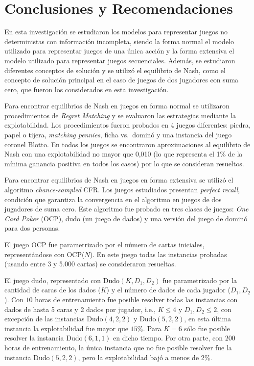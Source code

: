 \chapter*{Conclusiones y Recomendaciones}

En esta investigación se estudiaron los modelos para representar juegos no deterministas con información incompleta, siendo la forma normal el modelo utilizado para representar juegos de una única acción y la forma extensiva el modelo utilizado para representar juegos secuenciales. Además, se estudiaron diferentes conceptos de solución y se utilizó el equilibrio de Nash, como el concepto de solución principal en el caso de juegos de dos jugadores con suma cero, que fueron los considerados en esta investigación.

Para encontrar equilibrios de Nash en juegos en forma normal se utilizaron procedimientos de \textit{Regret Matching} y se evaluaron las estrategias mediante la explotabilidad. Los procedimientos fueron probados en 4 juegos diferentes: piedra, papel o tijera, \textit{matching pennies}, ficha vs.\ dominó y una instancia del juego coronel Blotto. En todos los juegos se encontraron aproximaciones al equilibrio de Nash con una explotabilidad no mayor que 0,010 (lo que representa el  1\% de la mínima ganancia positiva en todos los casos) por lo que se consideran resueltos.

Para encontrar equilibrios de Nash en juegos en forma extensiva se utilizó el algoritmo \textit{chance-sampled} CFR. Los juegos estudiados presentan \textit{perfect recall}, condición que garantiza la convergencia en el algoritmo en juegos de dos jugadores de suma cero. Este algoritmo fue probado en tres clases de juegos: \textit{One Card Poker} (OCP), dudo (un juego de dados) y una versión del juego de dominó para dos personas.

El juego OCP fue parametrizado por el número de cartas iniciales, representándose con OCP($N$). En este juego todas las instancias probadas (usando entre 3 y 5.000 cartas) se consideraron resueltas.

El juego dudo, representado con Dudo$(K, D_1, D_2)$ fue parametrizado por la cantidad de caras de los dados ($K$) y el número de dados de cada jugador ($D_1, D_2$). Con $10$ horas de entrenamiento fue posible resolver todas las instancias con dados de hasta 5 caras y 2 dados por jugador, i.e., $K \leq 4$ y $D_1, D_2 \leq 2$, con excepción de las instancias  Dudo$(4, 2, 2)$ y Dudo$(5, 2, 2)$, en esta última instancia la explotabilidad fue mayor que $15\%$. Para $K = 6$ sólo fue posible resolver la instancia Dudo$(6, 1, 1)$ en dicho tiempo. Por otra parte, con $200$ horas de entrenamiento, la única instancia que no fue posible resolver fue la instancia Dudo$(5,2,2)$, pero la explotabilidad bajó a menos de $2\%$.

